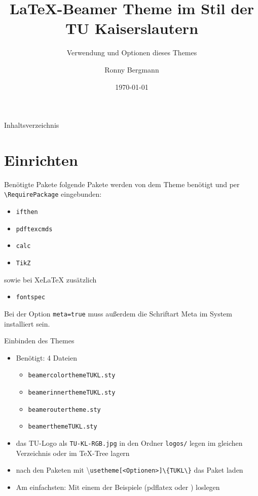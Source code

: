 \documentclass[german,10pt,xcolor=colortbl,compress
]{beamer}
\title{\LaTeX-Beamer Theme im Stil der TU Kaiserslautern}
\subtitle{Verwendung und Optionen dieses Themes}
\date[]{\today}
\author[R. Bergmann]{Ronny Bergmann}
\institute[]{AG Bildverarbeitung\\FB Mathematik\\TU Kaiserslautern}
\begin{document}
	\maketitle
	\begin{frame}{Inhaltsverzeichnis}
		\tableofcontents
	\end{frame}
	\section{Einrichten}
	\begin{frame}[fragile]{Benötigte Pakete}
		folgende Pakete werden von dem Theme benötigt und per \lstinline!\RequirePackage! eingebunden:
		\begin{itemize}
			\item \lstinline!ifthen!
			\item \lstinline!pdftexcmds!
			\item \lstinline!calc!
			\item \lstinline!TikZ!
		\end{itemize}\vspace{\baselineskip}
		sowie bei XeLaTeX zusätzlich
		\begin{itemize}
			\item \lstinline!fontspec!
		\end{itemize}\vspace{\baselineskip}
		Bei der Option \lstinline!meta=true! muss außerdem die Schriftart Meta im System installiert sein.
	\end{frame}
	\begin{frame}{Einbinden des Themes}
		\begin{itemize}
			\item Benötigt: 4 Dateien
			\begin{itemize}
				\item \lstinline|beamercolorthemeTUKL.sty|
				\item \lstinline|beamerinnerthemeTUKL.sty|
				\item \lstinline!beameroutertheme.sty!
				\item \lstinline|beamerthemeTUKL.sty| 
			\end{itemize}
			\item das TU-Logo als \lstinline!TU-KL-RGB.jpg! in den Ordner \lstinline!logos/! legen
			 im gleichen Verzeichnis oder im \TeX-Tree lagern
			\item nach den Paketen mit \textbackslash\lstinline|usetheme[<Optionen>]\{TUKL\}| das Paket laden
			\item Am einfachsten: Mit einem der Beispiele (pdflatex oder \XeLaTeX) loslegen
		\end{itemize}
	\end{frame}
\end{document}

